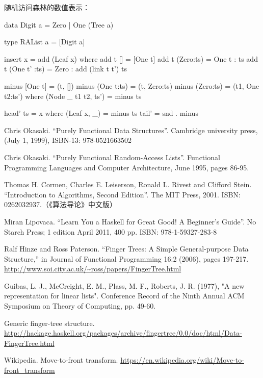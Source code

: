 \documentclass[b5paper]{ctexart}
\begin{document}
随机访问森林的数值表示：
\begin{Haskell}
data Digit a = Zero | One (Tree a)

type RAList a = [Digit a]

insert x = add (Leaf x) where
  add t [] = [One t]
  add t (Zero:ts) = One t : ts
  add t (One t' :ts) = Zero : add (link t t') ts

minus [One t] = (t, [])
minus (One t:ts) = (t, Zero:ts)
minus (Zero:ts) = (t1, One t2:ts') where
    (Node _ t1 t2, ts') = minus ts

head' ts = x where (Leaf x, _) = minus ts
tail' = snd . minus
\end{Haskell}

\ifx\wholebook\relax \else

\begin{thebibliography}{99}

Chris Okasaki. ``Purely Functional Data Structures''. Cambridge university press, (July 1, 1999), ISBN-13: 978-0521663502

Chris Okasaki. ``Purely Functional Random-Access Lists''. Functional Programming Languages and Computer Architecture, June 1995, pages 86-95.

Thomas H. Cormen, Charles E. Leiserson, Ronald L. Rivest and Clifford Stein. ``Introduction to Algorithms, Second Edition''. The MIT Press, 2001. ISBN: 0262032937.（《算法导论》中文版）

Miran Lipovaca. ``Learn You a Haskell for Great Good! A Beginner's Guide''. No Starch Press; 1 edition April 2011, 400 pp. ISBN: 978-1-59327-283-8

Ralf Hinze and Ross Paterson. ``Finger Trees: A Simple General-purpose Data Structure,'' in Journal of Functional Programming 16:2 (2006), pages 197-217. \url{http://www.soi.city.ac.uk/~ross/papers/FingerTree.html}

Guibas, L. J., McCreight, E. M., Plass, M. F., Roberts, J. R. (1977), "A new representation for linear lists". Conference Record of the Ninth Annual ACM Symposium on Theory of Computing, pp. 49-60.

Generic finger-tree structure. \url{http://hackage.haskell.org/packages/archive/fingertree/0.0/doc/html/Data-FingerTree.html}

Wikipedia. Move-to-front transform. \url{https://en.wikipedia.org/wiki/Move-to-front_transform}

\end{thebibliography}

\expandafter\enddocument
\fi
\end{document}
